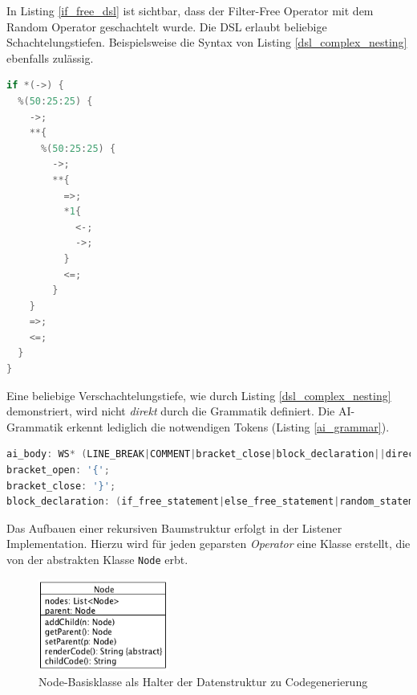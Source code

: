 \documentclass[conference]{IEEEtran}
\begin{document}
In Listing \ref{if_free_dsl} ist sichtbar, dass der Filter-Free Operator mit dem Random Operator geschachtelt wurde. Die DSL erlaubt beliebige Schachtelungstiefen. Beispielsweise die Syntax von Listing \ref{dsl_complex_nesting} ebenfalls zulässig.

\begin{lstlisting}[language=Java, captionpos=b, caption=Komplexere Verschachtelung in AI DSL, label=dsl_complex_nesting]
if *(->) {
  %(50:25:25) {
    ->;
    **{
      %(50:25:25) {
        ->;
        **{
          =>;
          *1{
            <-;
            ->;
          }
          <=;
        }
    }
    =>;
    <=;
  }
}
\end{lstlisting}

Eine beliebige Verschachtelungstiefe, wie durch Listing \ref{dsl_complex_nesting} demonstriert, wird  nicht \emph{direkt} durch die Grammatik definiert. Die AI-Grammatik erkennt lediglich die notwendigen Tokens (Listing \ref{ai_grammar}).

\begin{lstlisting}[language=Java, captionpos=b, caption=Ausschnitt der AI Grammatik, label=ai_grammar]
ai_body: WS* (LINE_BREAK|COMMENT|bracket_close|block_declaration||direction_statement);
bracket_open: '{';
bracket_close: '}';
block_declaration: (if_free_statement|else_free_statement|random_statement|leave_free_statement|get_nth_free_statement);
\end{lstlisting}

Das Aufbauen einer rekursiven Baumstruktur erfolgt in der Listener Implementation. Hierzu wird für jeden geparsten \emph{Operator} eine Klasse erstellt, die von der abstrakten Klasse \texttt{Node} erbt.


\begin{figure}[!htb]
\centering
\includegraphics[width=1.7in]{node_structure_node.png}

\caption{Node-Basisklasse als Halter der Datenstruktur zu Codegenerierung}
\label{node_class}
\end{figure}
\end{document}

